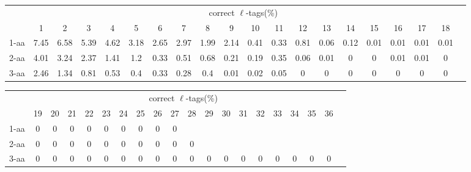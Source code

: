 \documentclass{article}[12pt]
\begin{document}
\begin{landscape}

\begin{table}[h]\tiny
\vspace{3mm}
{\centering
\begin{center}
\begin{tabular}{|l|c|c|c|c|c|c|c|c|c|c|c|c|c|c|c|c|c|c|c|}
  \hline
  & \multicolumn{ 18 }{|c|}{correct $\ell$-tags(\%)} \\
  \cline{2- 19}
    & 1 & 2 & 3 & 4 & 5 & 6 & 7 & 8 & 9 & 10 & 11 & 12 & 13 & 14 & 15 & 16 & 17 & 18\\
  \hline
1-aa  & 7.45 & 6.58 & 5.39 & 4.62 & 3.18 & 2.65 & 2.97 & 1.99 & 2.14 & 0.41 & 0.33 & 0.81 & 0.06 & 0.12 & 0.01 & 0.01 & 0.01 & 0.01\\
2-aa  & 4.01 & 3.24 & 2.37 & 1.41 & 1.2 & 0.33 & 0.51 & 0.68 & 0.21 & 0.19 & 0.35 & 0.06 & 0.01 & 0 & 0 & 0.01 & 0.01 & 0\\
3-aa  & 2.46 & 1.34 & 0.81 & 0.53 & 0.4 & 0.33 & 0.28 & 0.4 & 0.01 & 0.02 & 0.05 & 0 & 0 & 0 & 0 & 0 & 0 & 0\\
 \hline
\end{tabular}
\end{center}
\par}
\centering

\vspace{3mm}
\end{table}
\begin{table}[h]\tiny
\vspace{3mm}
{\centering
\begin{center}
\begin{tabular}{|l|c|c|c|c|c|c|c|c|c|c|c|c|c|c|c|c|c|c|c|}
  \hline
  & \multicolumn{ 18 }{|c|}{correct $\ell$-tags(\%)} \\
  \cline{2- 19}
    & 19 & 20 & 21 & 22 & 23 & 24 & 25 & 26 & 27 & 28 & 29 & 30 & 31 & 32 & 33 & 34 & 35 & 36\\
  \hline
1-aa  & 0 & 0 & 0 & 0 & 0 & 0 & 0 & 0 & 0 &  &  &  &  &  &  &  &  & \\
2-aa  & 0 & 0 & 0 & 0 & 0 & 0 & 0 & 0 & 0 & 0 &  &  &  &  &  &  &  & \\
3-aa  & 0 & 0 & 0 & 0 & 0 & 0 & 0 & 0 & 0 & 0 & 0 & 0 & 0 & 0 & 0 & 0 & 0 & 0\\
 \hline
\end{tabular}
\end{center}
\par}
\centering


\end{table}
\end{landscape}
\end{document}
